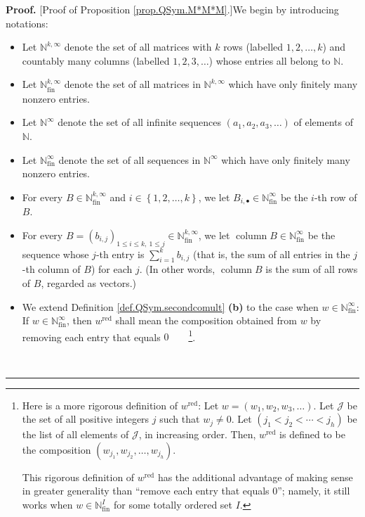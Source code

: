 \documentclass[numbers=enddot,12pt,final,onecolumn,notitlepage,abstracton]{scrartcl}%
\theoremstyle{definition}
\newenvironment{proof}[1][Proof]{\noindent\textbf{#1.} }{\ \rule{0.5em}{0.5em}}
\let\sumnonlimits\sum
\renewcommand{\sum}{\sumnonlimits\limits}
\begin{document}
\begin{proof}
[Proof of Proposition \ref{prop.QSym.M*M*M}.]We begin by introducing notations:

\begin{itemize}
\item Let $\mathbb{N}^{k,\infty}$ denote the set of all matrices with $k$ rows
(labelled $1,2,\ldots,k$) and countably many columns (labelled $1,2,3,\ldots$)
whose entries all belong to $\mathbb{N}$.

\item Let $\mathbb{N}_{\operatorname*{fin}}^{k,\infty}$ denote the set of all
matrices in $\mathbb{N}^{k,\infty}$ which have only finitely many nonzero entries.

\item Let $\mathbb{N}^{\infty}$ denote the set of all infinite sequences
$\left(  a_{1},a_{2},a_{3},\ldots\right)  $ of elements of $\mathbb{N}$.

\item Let $\mathbb{N}_{\operatorname*{fin}}^{\infty}$ denote the set of all
sequences in $\mathbb{N}^{\infty}$ which have only finitely many nonzero entries.

\item For every $B\in\mathbb{N}_{\operatorname*{fin}}^{k,\infty}$ and
$i\in\left\{  1,2,\ldots,k\right\}  $, we let $B_{i,\bullet}\in\mathbb{N}%
_{\operatorname*{fin}}^{\infty}$ be the $i$-th row of $B$.

\item For every $B=\left(  b_{i,j}\right)  _{1\leq i\leq k,\ 1\leq j}%
\in\mathbb{N}_{\operatorname*{fin}}^{k,\infty}$, we let
$\operatorname*{column}B\in\mathbb{N}_{\operatorname*{fin}}^{\infty}$ be the
sequence whose $j$-th entry is $\sum_{i=1}^{k}b_{i,j}$ (that is, the sum of
all entries in the $j$-th column of $B$) for each $j$. (In other words,
$\operatorname*{column}B$ is the sum of all rows of $B$, regarded as vectors.)

\item We extend Definition \ref{def.QSym.secondcomult} \textbf{(b)} to the
case when $w\in\mathbb{N}_{\operatorname*{fin}}^{\infty}$: If $w\in
\mathbb{N}_{\operatorname*{fin}}^{\infty}$, then $w^{\operatorname*{red}}$
shall mean the composition obtained from $w$ by removing each entry that
equals $0$\ \ \ \ \footnote{Here is a more rigorous definition of
$w^{\operatorname*{red}}$: Let $w=\left(  w_{1},w_{2},w_{3},\ldots\right)  $.
Let $\mathcal{J}$ be the set of all positive integers $j$ such that $w_{j}%
\neq0$. Let $\left(  j_{1}<j_{2}<\cdots<j_{h}\right)  $ be the list of all
elements of $\mathcal{J}$, in increasing order. Then, $w^{\operatorname*{red}%
}$ is defined to be the composition $\left(  w_{j_{1}},w_{j_{2}}%
,\ldots,w_{j_{h}}\right)  $.
\par
This rigorous definition of $w^{\operatorname*{red}}$ has the additional
advantage of making sense in greater generality than \textquotedblleft remove
each entry that equals $0$\textquotedblright; namely, it still works when
$w\in\mathbb{N}_{\operatorname*{fin}}^{I}$ for some totally ordered set $I$.}.


\end{itemize}
\end{proof}
\end{document}
